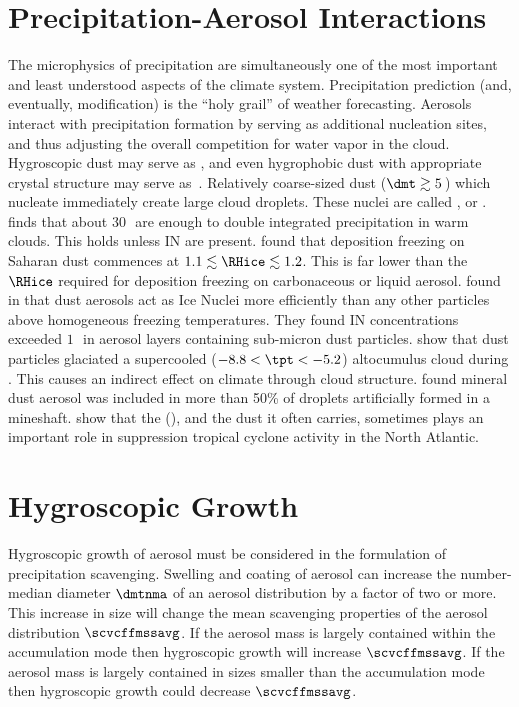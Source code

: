 \documentclass[12pt,twoside]{book}
\begin{document}
\section[Precipitation-Aerosol Interactions]{Precipitation-Aerosol Interactions}\label{sxn:pcp_aer}\label{sxn:ndr}
The microphysics of precipitation are simultaneously one of the most
important and least understood aspects of the climate system.
Precipitation prediction (and, eventually, modification) is the 
``holy grail'' of weather forecasting.
Aerosols interact with precipitation formation by serving as
additional nucleation sites, and thus adjusting the overall
competition for water vapor in the cloud.
Hygroscopic dust may serve as , and even hygrophobic dust
with appropriate crystal structure may serve as~.
Relatively coarse-sized dust ($\dmt \gtrsim 5$\,\um) which nucleate
immediately create large cloud droplets.
These nuclei are called , or
. 
 finds that about 30\,\GCCNxcmC\ are
enough to double integrated precipitation in warm clouds.
This holds unless IN are present.
 found that deposition freezing
on Saharan dust commences at $1.1 \lesssim \RHice \lesssim 1.2$.
This is far lower than the $\RHice$ required for deposition freezing
on carbonaceous or liquid aerosol.
\cite{DSP03} found in that dust aerosols act as
Ice Nuclei more efficiently than any other particles above
homogeneous freezing temperatures. 
They found IN concentrations exceeded $1$\,\xcmC\ in aerosol layers
containing sub-micron dust particles.
\cite{SDP03} show that dust particles glaciated a supercooled
($-8.8 < \tpt < -5.2$\dgrc) altocumulus cloud during
.
This causes an indirect effect on climate through cloud structure.
\cite{YTT04} found mineral dust aerosol was included in more than 50\%
of droplets artificially formed in a mineshaft.
\cite{DuV04} show that the  (),
and the dust it often carries, sometimes plays an important role in
suppression tropical cyclone activity in the North Atlantic. 

\section{Hygroscopic Growth}\label{sxn:scv_hyg}
Hygroscopic growth of aerosol must be considered in the formulation of
precipitation scavenging.
Swelling and coating of aerosol can increase the number-median
diameter $\dmtnma$ of an aerosol distribution by a factor of two or
more. 
This increase in size will change the mean scavenging properties of
the aerosol distribution $\scvcffmssavg$. 
If the aerosol mass is largely contained within the accumulation mode
then hygroscopic growth will increase $\scvcffmssavg$.
If the aerosol mass is largely contained in sizes smaller than the
accumulation mode then hygroscopic growth could decrease
$\scvcffmssavg$. 
\end{document}
